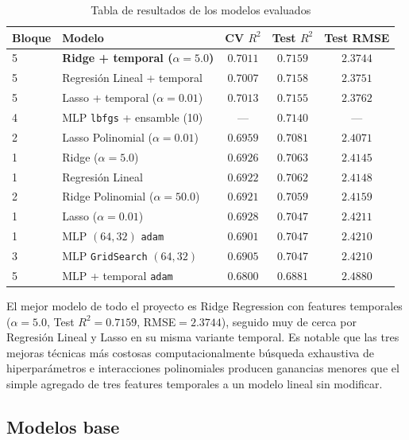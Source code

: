\documentclass[11pt,a4paper]{article}
\begin{document}
\begin{table}[H]
\centering
\caption{Tabla de resultados de los modelos evaluados}
\label{tab:maestra}
\renewcommand{\arraystretch}{1.25}
\small
\begin{tabular}{|l|l|c|c|c|}
\hline
\textbf{Bloque} & \textbf{Modelo} & \textbf{CV $R^2$} & \textbf{Test $R^2$} & \textbf{Test RMSE} \\
\hline
5 & \textbf{Ridge + temporal ($\alpha=5.0$)} & $0.7011$ & $\mathbf{0.7159}$ & $\mathbf{2.3744}$ \\
\hline
5 & Regresión Lineal + temporal & $0.7007$ & $0.7158$ & $2.3751$ \\
\hline
5 & Lasso + temporal ($\alpha=0.01$) & $0.7013$ & $0.7155$ & $2.3762$ \\
\hline
4 & MLP \texttt{lbfgs} + ensamble (10) & --- & $0.7140$ & --- \\
\hline
2 & Lasso Polinomial ($\alpha=0.01$) & $0.6959$ & $0.7081$ & $2.4071$ \\
\hline
1 & Ridge ($\alpha=5.0$) & $0.6926$ & $0.7063$ & $2.4145$ \\
\hline
1 & Regresión Lineal & $0.6922$ & $0.7062$ & $2.4148$ \\
\hline
2 & Ridge Polinomial ($\alpha=50.0$) & $0.6921$ & $0.7059$ & $2.4159$ \\
\hline
1 & Lasso ($\alpha=0.01$) & $0.6928$ & $0.7047$ & $2.4211$ \\
\hline
1 & MLP $(64,32)$ \texttt{adam} & $0.6901$ & $0.7047$ & $2.4210$ \\
\hline
3 & MLP \texttt{GridSearch} $(64,32)$ & $0.6905$ & $0.7047$ & $2.4210$ \\
\hline
5 & MLP + temporal \texttt{adam} & $0.6800$ & $0.6881$ & $2.4880$ \\
\hline
\end{tabular}
\end{table}
El mejor modelo de todo el proyecto es Ridge Regression con features
temporales ($\alpha=5.0$, Test $R^2=0.7159$, RMSE$=2.3744$), seguido muy de
cerca por Regresión Lineal y Lasso en su misma variante temporal. Es
notable que las tres mejoras técnicas más costosas computacionalmente
búsqueda exhaustiva de hiperparámetros e interacciones
polinomiales producen ganancias menores que el simple agregado
de tres features temporales a un modelo lineal sin modificar.

\subsection{Modelos base}
\end{document}
